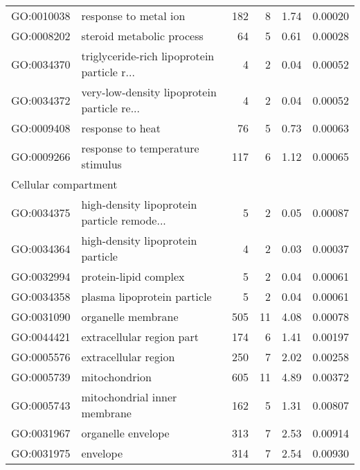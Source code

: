 \begin{longtable}{lp{5cm}rrrl}
  GO:0010038 & response to metal ion & 182 &   8 & 1.74 & 0.00020 \\ 
  GO:0008202 & steroid metabolic process &  64 &   5 & 0.61 & 0.00028 \\ 
  GO:0034370 & triglyceride-rich lipoprotein particle r... &   4 &   2 & 0.04 & 0.00052 \\ 
  GO:0034372 & very-low-density lipoprotein particle re... &   4 &   2 & 0.04 & 0.00052 \\ 
  GO:0009408 & response to heat &  76 &   5 & 0.73 & 0.00063 \\ 
  GO:0009266 & response to temperature stimulus & 117 &   6 & 1.12 & 0.00065 \\ 
  \hline
  \multicolumn{6}{l}{Cellular compartment}  \\  
  GO:0034375 & high-density lipoprotein particle remode... &   5 &   2 & 0.05 & 0.00087 \\ 
  GO:0034364 & high-density lipoprotein particle &   4 &   2 & 0.03 & 0.00037 \\ 
  GO:0032994 & protein-lipid complex &   5 &   2 & 0.04 & 0.00061 \\ 
  GO:0034358 & plasma lipoprotein particle &   5 &   2 & 0.04 & 0.00061 \\ 
  GO:0031090 & organelle membrane & 505 &  11 & 4.08 & 0.00078 \\ 
  GO:0044421 & extracellular region part & 174 &   6 & 1.41 & 0.00197 \\ 
  GO:0005576 & extracellular region & 250 &   7 & 2.02 & 0.00258 \\ 
  GO:0005739 & mitochondrion & 605 &  11 & 4.89 & 0.00372 \\ 
  GO:0005743 & mitochondrial inner membrane & 162 &   5 & 1.31 & 0.00807 \\ 
  GO:0031967 & organelle envelope & 313 &   7 & 2.53 & 0.00914 \\ 
  GO:0031975 & envelope & 314 &   7 & 2.54 & 0.00930 \\ 
   \hline
\end{longtable}


